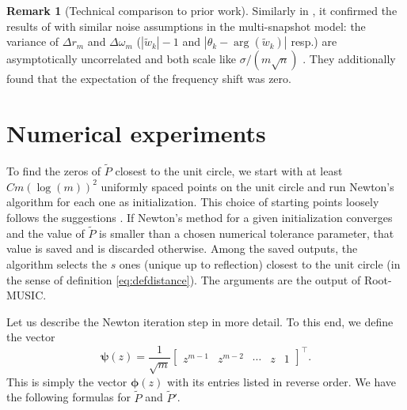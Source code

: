 \documentclass[11pt]{article}
\theoremstyle{definition}
\newtheorem{remark}[theorem]{Remark}
\numberwithin{theorem}{section}
\numberwithin{equation}{section}
\renewcommand{\tilde}{\widetilde}
\newcommand{\bfU}{{\boldsymbol U}}
\newcommand{\bfphi}{{\boldsymbol \phi}}
\newcommand{\bfpsi}{{\boldsymbol \psi}}
\numberwithin{equation}{section}
\begin{document}
\begin{remark}[Technical comparison to prior work]
    Similarly in \cite{krim1992operator}, it confirmed the results of \cite{rao1989performance} with similar noise assumptions in the multi-snapshot model: the variance of $\Delta r_m$ and $\Delta \omega_m$ ($\left| \tilde w_k\right| -1$ and $\left| \theta_k - \arg(\tilde w_k) \right|$ resp.) are asymptotically uncorrelated and both scale like $\sigma/(m\sqrt{n})$ \cite[(58), (59), and (60)]{krim1992operator}. They additionally found that the expectation of the frequency shift was zero. 
\end{remark}

\section{Numerical experiments}
\label{sec:experiments}
To find the zeros of $\tilde P$ closest to the unit circle, we start with at least $Cm (\log(m))^2$ uniformly spaced points on the unit circle and run Newton's algorithm for each one as initialization. This choice of starting points loosely follows the suggestions \cite{hubbard2001find}. If Newton's method for a given initialization converges and the value of $\tilde P$ is smaller than a chosen numerical tolerance parameter, that value is saved and is discarded otherwise. Among the saved outputs, the algorithm selects the $s$ ones (unique up to reflection) closest to the unit circle (in the sense of definition \eqref{eq:defdistance}). The arguments are the output of Root-MUSIC. 

Let us describe the Newton iteration step in more detail. 
To this end, we define the vector
\begin{equation}
    \bfpsi(z)
    = \frac1 {\sqrt m} \begin{bmatrix}
        z^{m-1} &z^{m-2} &\cdots &z & 1
    \end{bmatrix}^\top.
    \label{eq:defpsi}
\end{equation}
This is simply the vector $\bfphi(z)$ with its entries listed in reverse order. We have the following formulas for $\tilde P$ and $\tilde P'$. 
\end{document}
